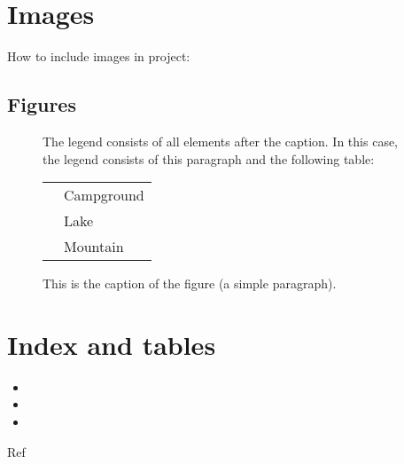 \documentclass[letterpaper,10pt,english]{sphinxmanual}
\begin{document}
\chapter{Images}
\label{\detokenize{usage/images:images}}\label{\detokenize{usage/images::doc}}
How to include images in project:



\section{Figures}
\label{\detokenize{usage/images:figures}}\begin{figure}[htbp]
\centering
\capstart

\noindent{}
\caption{This is the caption of the figure (a simple paragraph).}
\begin{sphinxlegend}
The legend consists of all elements after the caption.  In this
case, the legend consists of this paragraph and the following
table:

\noindent\begin{tabulary}{\linewidth}{|L|L|}
\hline
{}\relax &\relax \\
\hline
\noindent{}
&
Campground
\\
\hline
\noindent{}
&
Lake
\\
\hline
\noindent{}
&
Mountain
\\
\hline\end{tabulary}

\end{sphinxlegend}
\label{\detokenize{usage/images:id1}}\end{figure}


\chapter{Index and tables}
\label{\detokenize{index:index-and-tables}}\begin{itemize}
\item {} 

\item {} 

\item {} 

\end{itemize}

\begin{sphinxthebibliography}{Ref}
\end{sphinxthebibliography}



\renewcommand{\indexname}{Index}
\printindex
\end{document}
